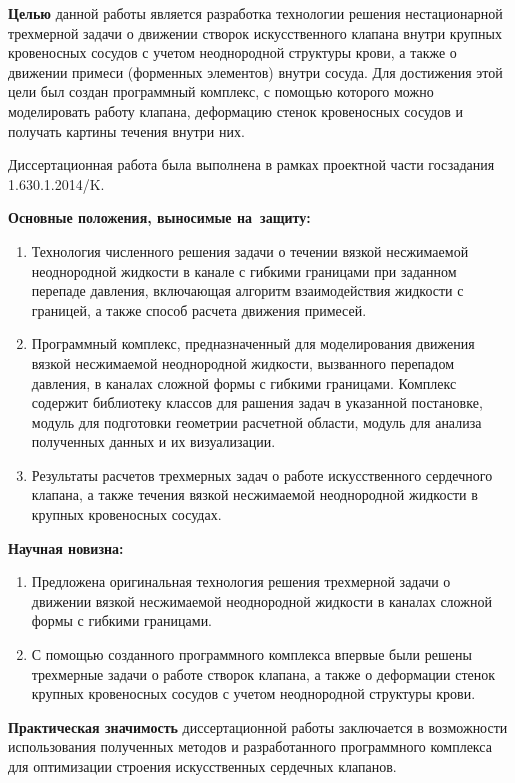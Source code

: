 \textbf{Целью} данной работы является разработка технологии решения нестационарной трехмерной задачи о движении створок искусственного клапана внутри крупных кровеносных сосудов с учетом неоднородной структуры крови, а также о движении примеси (форменных элементов) внутри сосуда. Для достижения этой цели был создан программный комплекс, с помощью которого можно моделировать работу клапана, деформацию стенок кровеносных сосудов и получать картины течения внутри них.

Диссертационная работа была выполнена в рамках проектной части госзадания 1.630.1.2014/K.

\textbf{Основные положения, выносимые на~защиту:}
\begin{enumerate}
 \item Технология численного решения задачи о течении вязкой несжимаемой неоднородной жидкости
     в канале с гибкими границами при заданном перепаде давления, включающая алгоритм взаимодействия
     жидкости с границей, а также способ расчета движения примесей.
 \item Программный комплекс, предназначенный для моделирования движения вязкой несжимаемой неоднородной
     жидкости, вызванного перепадом давления, в каналах сложной формы с гибкими границами. Комплекс содержит
     библиотеку классов для рашения задач в указанной постановке, модуль для подготовки геометрии расчетной области,
     модуль для анализа полученных данных и их визуализации.
 \item Результаты расчетов трехмерных задач о работе искусственного сердечного клапана, а также течения вязкой несжимаемой
     неоднородной жидкости в крупных кровеносных сосудах.
\end{enumerate}

\textbf{Научная новизна:}
\begin{enumerate}
 \item Предложена оригинальная технология решения трехмерной задачи о движении вязкой несжимаемой неоднородной
     жидкости в каналах сложной формы с гибкими границами.
 \item С помощью созданного программного комплекса впервые были решены трехмерные задачи о работе створок клапана, а также о деформации
     стенок крупных кровеносных сосудов с учетом неоднородной структуры крови.
\end{enumerate}

\textbf{Практическая значимость} диссертационной работы заключается в возможности использования полученных методов
и разработанного программного комплекса для оптимизации строения искусственных сердечных клапанов.

